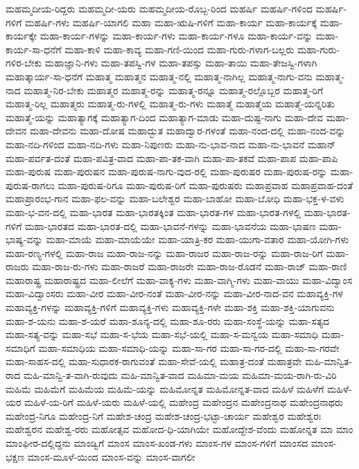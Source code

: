 {ಮಹಮ್ಮದೀಯ-ರಿದ್ದರು
ಮಹಮ್ಮದೀ-ಯರು
ಮಹಮ್ಮದೀಯ-ರೊಬ್ಬ-ರಿಂದ
ಮಹರ್ಷಿ
ಮಹರ್ಷಿ-ಗಳಿಂದ
ಮಹರ್ಷಿ-ಗಳಿಗೆ
ಮಹರ್ಷಿ-ಗಳು
ಮಹರ್ಷಿ-ಯಾಗಲಿ
ಮಹಾ
ಮಹಾ-ಋಷಿ-ಗಳಿಗೆ
ಮಹಾ-ಕಾರ್ಯ
ಮಹಾ-ಕಾರ್ಯಕ್ಕೆ
ಮಹಾ-ಕಾರ್ಯಕ್ಕೇ
ಮಹಾ-ಕಾರ್ಯ-ಗಳನ್ನು
ಮಹಾ-ಕಾರ್ಯ-ಗಳು
ಮಹಾ-ಕಾರ್ಯ-ಗಳೂ
ಮಹಾ-ಕಾರ್ಯ-ವನ್ನು
ಮಹಾ-ಕಾರ್ಯ-ಸಾ-ಧನೆಗೆ
ಮಹಾ-ಕಾಳಿ
ಮಹಾ-ಕಾವ್ಯ
ಮಹಾ-ಗಣಿ-ಯಿಂದ
ಮಹಾ-ಗುರು-ಗಳಾಗ-ಬಲ್ಲರು
ಮಹಾ-ಗುರು-ಗಳಿರ-ಬೇಕು
ಮಹಾಜ್ಞಾನಿ-ಗಳು
ಮಹಾ-ತಪಸ್ವಿ-ಗಳ
ಮಹಾ-ತಪಸ್ಸು
ಮಹಾ-ತಾಯಿ
ಮಹಾ-ತೇಜಸ್ವಿ-ಗಳಾಗಿ
ಮಹಾತ್ಕಾರ್ಯ-ಸಾ-ಧನೆಗೆ
ಮಹಾತ್ಮ
ಮಹಾತ್ಮನ
ಮಹಾತ್ಮ-ನಲ್ಲಿ
ಮಹಾತ್ಮ-ನಾಗಿಲ್ಲ
ಮಹಾತ್ಮ-ನಾಗು-ವನು
ಮಹಾತ್ಮ-ನಾದ
ಮಹಾತ್ಮ-ನಿರ-ಬೇಕು
ಮಹಾತ್ಮರ
ಮಹಾತ್ಮ-ರನ್ನು
ಮಹಾತ್ಮ-ರನ್ನೂ
ಮಹಾತ್ಮ-ರಲ್ಲೊಬ್ಬರ
ಮಹಾತ್ಮ-ರಿಗೆ
ಮಹಾತ್ಮ-ರಿಲ್ಲ
ಮಹಾತ್ಮರು
ಮಹಾತ್ಮ-ರು-ಗಳಲ್ಲಿ
ಮಹಾತ್ಮ-ರು-ಗಳು
ಮಹಾತ್ಮೆ
ಮಹಾತ್ಮೆಯ
ಮಹಾತ್ಮೆ-ಯನ್ನರಿತು
ಮಹಾತ್ಮೆ-ಯನ್ನು
ಮಹಾತ್ಯಾಗಕ್ಕೆ
ಮಹಾತ್ಯಾಗ-ದಿಂದ
ಮಹಾತ್ಯಾಗ-ಮಾಡು
ಮಹಾ-ದುಷ್ಟ-ನಾಗು
ಮಹಾ-ದೇವ
ಮಹಾ-ದೇವನ
ಮಹಾ-ದೇವನು
ಮಹಾ-ದೋಷ
ಮಹಾದ್ಭುತ
ಮಹಾದ್ವಾರ-ಗಳಂತೆ
ಮಹಾ-ನಂದ-ದಲ್ಲಿ
ಮಹಾ-ನಂದ-ವನ್ನು
ಮಹಾ-ನದಿ-ಗಳಿಂದ
ಮಹಾ-ನದಿ-ಗಳು
ಮಹಾ-ನಿಪುಣರು
ಮಹಾ-ನು-ಭಾವ-ನಾದ
ಮಹಾ-ನು-ಭಾವನೆ
ಮಹಾನ್
ಮಹಾ-ಪರ್ವತ-ದಂತೆ
ಮಹಾ-ಪವಿತ್ರ-ವಾದ
ಮಹಾ-ಪಾ-ತಕ-ವಾಗಿ
ಮಹಾ-ಪಾ-ತಕವೆ
ಮಹಾ-ಪಾಪ
ಮಹಾ-ಪಾಪಿ
ಮಹಾ-ಪುರುಷ
ಮಹಾ-ಪುರುಷನ
ಮಹಾ-ಪುರುಷ-ನಾಗು-ವುದ-ರಲ್ಲಿ
ಮಹಾ-ಪುರುಷರ
ಮಹಾ-ಪುರುಷ-ರನ್ನು
ಮಹಾ-ಪುರುಷ-ರಾಗಲು
ಮಹಾ-ಪುರುಷ-ರಿಗೂ
ಮಹಾ-ಪುರುಷ-ರಿಗೆ
ಮಹಾ-ಪುರುಷರು
ಮಹಾಪ್ರವಾಹ
ಮಹಾಪ್ರವಾಹ-ದಂತೆ
ಮಹಾಪ್ರಾರಂಭ-ಗಾನ
ಮಹಾ-ಫಲ-ವನ್ನು
ಮಹಾ-ಬಲೇಶ್ವರ
ಮಹಾ-ಬಾಹೋ
ಮಹಾ-ಬೋಧಿ
ಮಹಾ-ಭಕ್ತ-ಳ-ವಳು
ಮಹಾ-ಭ-ವನ-ದಲ್ಲಿ
ಮಹಾ-ಭಾರತ
ಮಹಾ-ಭಾರತಕ್ಕಿಂತ
ಮಹಾ-ಭಾರತ-ಗಳ
ಮಹಾ-ಭಾರತ-ಗಳಲ್ಲಿ
ಮಹಾ-ಭಾರತ-ಗಳಿಗೆ
ಮಹಾ-ಭಾರತದ
ಮಹಾ-ಭಾರತ-ದಲ್ಲಿ
ಮಹಾ-ಭಾವನೆ-ಗಳನ್ನು
ಮಹಾ-ಭಾವನೆಯ
ಮಹಾ-ಭಾಷಣ
ಮಹಾ-ಭಾಷ್ಯ-ವನ್ನು
ಮಹಾ-ಮಾಯೆ
ಮಹಾ-ಮಾಯೆಯೇ
ಮಹಾ-ಯಾತ್ರಿ-ಕರ
ಮಹಾ-ಯುಗಾ-ವತಾರ
ಮಹಾ-ಯೋಗಿ-ಗಳು
ಮಹಾ-ರಣ್ಯ-ಗಳಲ್ಲಿ
ಮಹಾ-ರಾಜ
ಮಹಾ-ರಾಜ-ನನ್ನು
ಮಹಾ-ರಾಜರ
ಮಹಾ-ರಾಜ-ರನ್ನು
ಮಹಾ-ರಾಜ-ರಿಗೆ
ಮಹಾ-ರಾಜರು
ಮಹಾ-ರಾಜ-ರು-ಗಳು
ಮಹಾ-ರಾಜರೆ
ಮಹಾ-ರಾಜರೇ
ಮಹಾ-ರಾಜ-ರೊಡನೆ
ಮಹಾ-ರಾಜ್
ಮಹಾ-ರಾಣಿ
ಮಹಾರಾಷ್ಟ್ರ
ಮಹಾರಾಷ್ಟ್ರದ
ಮಹಾ-ಲೀಲೆಗೆ
ಮಹಾ-ವಾಕ್ಯ-ಗಳು
ಮಹಾ-ವಾಗ್ಮಿ-ಗಳು
ಮಹಾ-ವಾಯು
ಮಹಾ-ವಿದ್ವಾಂಸ
ಮಹಾ-ವಿದ್ವಾಂಸರು
ಮಹಾ-ವೀರ
ಮಹಾ-ವೀರ-ನಂತೆ
ಮಹಾ-ವೀರ-ನನ್ನು
ಮಹಾ-ವೀರ-ನಾದ-ವನ
ಮಹಾವ್ಯಕ್ತಿ-ಗಳ
ಮಹಾವ್ಯಕ್ತಿ-ಗಳನ್ನು
ಮಹಾವ್ಯಕ್ತಿ-ಗಳಿಗೆ
ಮಹಾವ್ಯಕ್ತಿ-ಗಳು
ಮಹಾವ್ಯಕ್ತಿ-ಗಳೇ
ಮಹಾ-ಶಕ್ತಿ
ಮಹಾ-ಶಕ್ತಿ-ಯಾಗುವನು
ಮಹಾ-ಶ-ಯನು
ಮಹಾ-ಶ-ಯರೆ
ಮಹಾ-ಶೂನ್ಯ-ದಲ್ಲಿ
ಮಹಾ-ಶೂ-ರರು
ಮಹಾ-ಸಂಸ್ಥೆ-ಯನ್ನು
ಮಹಾ-ಸತ್ಯದ
ಮಹಾ-ಸತ್ಯ-ವನ್ನು
ಮಹಾ-ಸಭೆ
ಮಹಾ-ಸ-ಭೆಯ
ಮಹಾ-ಸಭೆ-ಯಲ್ಲಿ
ಮಹಾ-ಸ-ಮನ್ವಯ
ಮಹಾ-ಸಮಾಧಿ
ಮಹಾ-ಸಮಾಧಿಗೆ
ಮಹಾ-ಸಮಾಧಿಯ
ಮಹಾ-ಸಮಾಧಿ-ಯನ್ನು
ಮಹಾ-ಸಾ-ಗರ
ಮಹಾ-ಸಾ-ಗರ-ದಲ್ಲಿ
ಮಹಾ-ಸಾ-ಗರವೇ
ಮಹಾ-ಸಾಹಸ-ದಲ್ಲಿ
ಮಹಾ-ಸುಧಾರಕ-ರಾಗುವಂತೆ
ಮಹಾ-ಸೇವೆ-ಯಲ್ಲಿ
ಮಹಾತ್ರ-ದಂತೆ
ಮಹಾತ್ರವೇ
ಮಹಿ-ಮಾನ್ವಿತ-ರಾದ
ಮಹಿ-ಮಾನ್ವಿ-ತ-ವಾಗಿ-ರುವುದು
ಮಹಿ-ಮಾನ್ವಿತ-ವಾದ
ಮಹಿಮಾ-ಮಯ
ಮಹಿಮಾ-ಮಯ-ರಾಗಿ-ರು-ವಿರಿ
ಮಹಿಮೆ
ಮಹಿಮೆಗೆ
ಮಹಿಮೆಯ
ಮಹಿಮೆ-ಯನ್ನು
ಮಹಿಮೋನ್ನತ
ಮಹಿಮೋನ್ನತ-ವಾದ
ಮಹಿಳೆ
ಮಹಿಳೆಗೆ
ಮಹಿಳೆ-ಯರ
ಮಹಿಳೆ-ಯ-ರಿಗೆ
ಮಹಿಳೆ-ಯರು
ಮಹಿಳೆ-ಯಲ್ಲಿ
ಮಹೇಂದ್ರ
ಮಹೇಂದ್ರನ
ಮಹೇಂದ್ರನಾಥ
ಮಹೇಂದ್ರನಾಥರು
ಮಹೇಂದ್ರ-ನಿಗೂ
ಮಹೇಂದ್ರ-ನಿಗೆ
ಮಹೇಶ-ಚಂದ್ರ
ಮಹೇಶ-ಚಂದ್ರ-ಭಟ್ಟಾ-ಚಾರ್ಯ
ಮಹೇಶ್ವರ
ಮಹೇಶ್ವರಃ
ಮಹೇಶ್ವರನ
ಮಹೇಶ್ವ-ರರು
ಮಹೋತ್ಸವ
ಮಹೋದ-ಧಿ-ಯಾಗಿಯೇ
ಮಹೋದ್ದೇಶ-ವೆಂದು
ಮಹೋನ್ನತ
ಮಾ
ಮಾಂ
ಮಾಂಘೀರ-ದಲ್ಲಿದ್ದನು
ಮಾಂಡ್ವಿಗೆ
ಮಾಂಸ
ಮಾಂಸ-ಖಂಡ-ಗಳು
ಮಾಂಸ-ಗಳ
ಮಾಂಸ-ಗಳಿಗೆ
ಮಾಂಸದ
ಮಾಂಸ-ಭಕ್ಷಣ
ಮಾಂಸ-ಮೂಳೆ-ಯಿಂದ
ಮಾಂಸ-ವನ್ನು
ಮಾಂಸ-ವಾಗಲೀ
}
